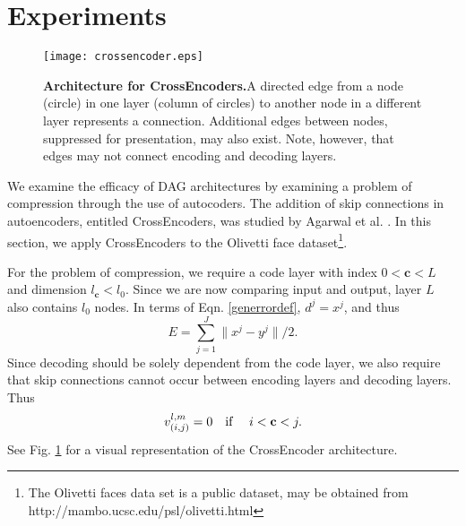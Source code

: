 \documentclass{jcmlatex}
\begin{document}
\section{Experiments}\label{sec:experiment}\begin{figure}
\centering
\texttt{[image: crossencoder.eps]}
\caption{\textbf{Architecture for CrossEncoders.}A directed edge from a node (circle) in one layer (column of circles) to another node in a different layer represents a connection. Additional edges  between nodes, suppressed for presentation, may also exist. Note, however, that edges may not connect encoding and decoding layers. }\label{autofig}
\end{figure}

We examine the efficacy of DAG architectures by  examining a problem of compression through the use of autocoders. The addition of skip connections in autoencoders, entitled CrossEncoders, was studied by Agarwal et al. \cite{agarwal2018crossencoder}.  In this section, we apply CrossEncoders to the Olivetti face dataset\footnote{ The Olivetti faces data set is a public dataset, may be obtained from http://mambo.ucsc.edu/psl/olivetti.html}. 

For the problem of compression, we require a code layer with index $0<\mathbf c<L$ and dimension $l_\mathbf c < l_0$. Since we are now comparing input and output, layer $L$ also contains $l_0$ nodes. In terms of Eqn.  \ref{generrordef}, $d^j = x^j$, and thus
\begin{equation}
E = \sum_{j = 1}^J \|x^j-y^j\|/2. 
\end{equation}
Since decoding should be solely dependent  from the code layer, we also require that skip connections cannot occur between encoding layers and decoding layers.  Thus
 \begin{equation}
 v_{(i,j)}^{l,m} = 0 \quad \hbox{if }  \quad i<\mathbf c < j. \label{encoderequire}
 \end{equation}
 See Fig. \ref{autofig} for a visual representation of the CrossEncoder architecture. 
\end{document}
